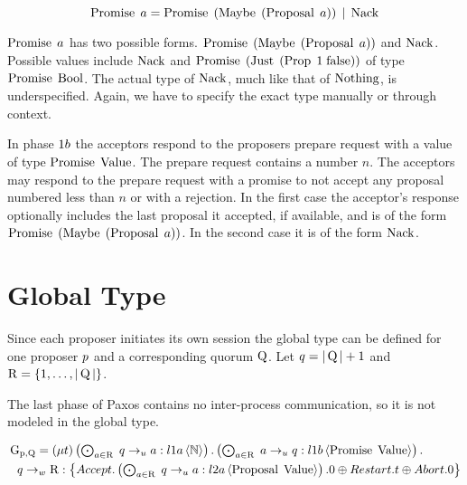 \[\operatorname{Promise}\; a = \operatorname{Promise}\; \left(\operatorname{Maybe}\; \left(\operatorname{Proposal}\; a\right)\right) \; | \; \operatorname{Nack}\]

$\operatorname{Promise}\; a$ has two possible forms.
$\operatorname{Promise}\; \left(\operatorname{Maybe}\; \left(\operatorname{Proposal}\; a\right)\right)$ and $\operatorname{Nack}$.
Possible values include $\operatorname{Nack}$ and $\operatorname{Promise}\; \left(\operatorname{Just}\; \left(\operatorname{Prop}\; 1\; {\operatorname{false}}\right)\right)$ of type $\operatorname{Promise}\; \mathbb{\operatorname{Bool}}$.
The actual type of $\operatorname{Nack}$, much like that of $\operatorname{Nothing}$, is underspecified.
Again, we have to specify the exact type manually or through context.

In phase $1b$ the acceptors respond to the proposers prepare request with a value of type $\operatorname{Promise}\; \operatorname{Value}$.
The prepare request contains a number $n$.
The acceptors may respond to the prepare request with a promise to not accept any proposal numbered less than $n$ or with a rejection.
In the first case the acceptor's response optionally includes the last proposal it accepted, if available, and is of the form $\operatorname{Promise}\; \left(\operatorname{Maybe}\; \left(\operatorname{Proposal}\; a\right)\right)$.
In the second case it is of the form $\operatorname{Nack}$.

\section{Global Type}
Since each proposer initiates its own session the global type can be defined for one proposer $p$ and a corresponding quorum $\operatorname{Q}$.
Let $q = |\operatorname{Q}| + 1$ and $\operatorname{R} = \left\{1,\ldots,|\operatorname{Q}|\right\}$.

The last phase of Paxos contains no inter-process communication, so it is not modeled in the global type.

\begin{align*}
    &\operatorname{G_{p, \operatorname{Q}}} =
        \left(\mu t\right)
        \textstyle\left(\bigodot_{
            a \in \operatorname{R}
        }\;
            q \to_u a : l1a \left\langle \mathbb{N} \right\rangle
        \right) .
        \textstyle\left(\bigodot_{
            a \in \operatorname{R}
        }\;
            a \to_u q : l1b \left\langle \operatorname{Promise}\; \operatorname{Value} \right\rangle
        \right) .\\
    &\hspace*{0.75em * 1}
        q \to_w \operatorname{R} : \left\{
            \mathnormal{Accept}.
                \textstyle\left(\bigodot_{
                    a \in \operatorname{R}
                }\;
                    q \to_u a : l2a \left\langle \operatorname{Proposal}\; \operatorname{Value} \right\rangle
                \right).
                0
            \oplus \mathnormal{Restart}.
                t
            \oplus \mathnormal{Abort}.
                0
        \right\}
\end{align*}


